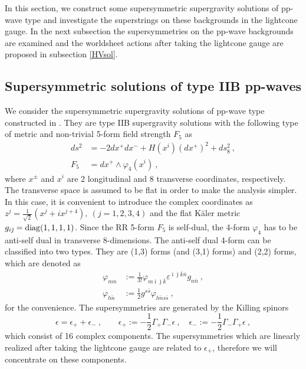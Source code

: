\documentclass[a4paper,12pt]{article}
\numberwithin{equation}{section}
\newcommand{\ib}{\bar{\imath}}
\newcommand{\jb}{\bar{\jmath}}
\newcommand{\kb}{\bar{k}}
\newcommand{\nb}{\bar{n}}
\newcommand{\vp}{\varphi}
\newcommand{\ve}{\varepsilon}
\newcommand{\nn}{\nonumber\\}
\begin{document}
In this section, we construct some supersymmetric supergravity solutions
of pp-wave type and investigate the superstrings on these backgrounds 
in the lightcone gauge.
In the next subsection the supersymmetries on the pp-wave backgrounds
are examined and the worldsheet actions after taking the lightcone gauge are
proposed in subsection \ref{HVsol}.

\subsection{Supersymmetric solutions of type IIB pp-waves}

We consider the supersymmetric supergravity solutions of
pp-wave type constructed in \cite{Maldacena:2002fy}.
They are type IIB supergravity solutions with the following type of 
metric and non-trivial 5-form field strength $F_5$ as
\begin{align}
 ds^2 &= - 2dx^{+}dx^{-} + H(x^i) (dx^{+})^2 + d s^2_8 ~,\nn
 F_5 &= dx^+ \wedge \vp_4 (x^i)~,
\end{align}
where $x^{\pm}$ and $x^i$ are 2 longitudinal and 8 transverse
coordinates, respectively. 
The transverse space is assumed to be flat in order to make the
analysis simpler.
In this case, it is convenient to introduce the complex coordinates as 
$z^j = \frac{1}{\sqrt{2}} (x^j + i x^{j+4}),\ (j=1,2,3,4)$ and
the flat K\"aler metric $g_{i\jb}={\rm diag}(1,1,1,1)$.
Since the RR 5-form $F_5$ is self-dual, the 4-form $\vp_4$ has to be
anti-self dual in transverse 8-dimensions.  
The anti-self dual 4-form can be classified into two types.
They are (1,3) forms (and (3,1) forms) and (2,2) forms, which are denoted as
\begin{align}
 \vp_{mn}&:=\frac{1}{3!}\vp_{m\ib\jb\kb}\ve^{\ib\jb\kb\nb}g_{n\nb}~,\nn
 \vp_{l\bar{m}} &:= \frac{1}{2} g^{s \bar{s}} \vp_{l \bar{m} s \bar{s}} ~,
\end{align}
for the convenience.
The supersymmetries are generated by the Killing spinors
\begin{equation}
 \epsilon 
          = \epsilon_+ + \epsilon_- ~,\qquad
\epsilon_{+}:= - \frac{1}{2} \Gamma_+ \Gamma_- \epsilon~,\quad
\epsilon_{-}:= - \frac{1}{2} \Gamma_- \Gamma_+ \epsilon~, 
\end{equation}
which consist of 16 complex components.
The supersymmetries which are linearly realized
after taking the lightcone gauge are related to $\epsilon_+$,
therefore we will concentrate on these components.
\end{document}

